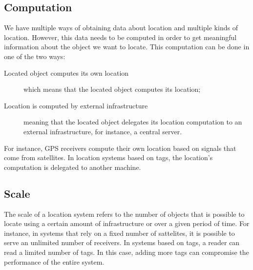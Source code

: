 \subsection{Computation}
\label{sub:background_computation}
We have multiple ways of obtaining data about location and multiple kinds of location.
However, this data needs to be computed in order to get meaningful information about the object we want to locate.
This computation can be done in one of the two ways:
\begin{description}
  \item[Located object computes its own location] which means that the located object computes its location;
  \item[Location is computed by external infrastructure] meaning that the located object delegates its location computation to an external infrastructure, for instance, a central server.
\end{description}

For instance, \gls{GPS} receivers compute their own location based on signals that come from satellites.
In location systems based on tags, the location's computation is delegated to another machine.

\subsection{Scale}
\label{sub:background_scale}
The scale of a location system refers to the number of objects that is possible to locate using a certain amount of infrastructure or over a given period of time.
For instance, in systems that rely on a fixed number of sattelites, it is possible to serve an unlimited number of receivers.
In systems based on tags, a reader can read a limited number of tags.
In this case, adding more tags can compromise the performance of the entire system.


